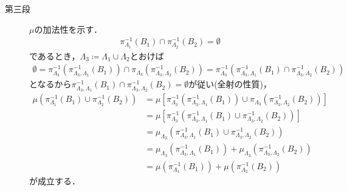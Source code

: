 \begin{prf}
\begin{description}
			\item[第三段]
				$\mu$の加法性を示す．
				\begin{align}
					\pi_{\Lambda_1}^{-1}(B_1) \cap \pi_{\Lambda_2}^{-1}(B_2) = \emptyset
				\end{align}
				であるとき，$\Lambda_3 \coloneqq \Lambda_1 \cup \Lambda_2$とおけば
				\begin{align}
					\emptyset 
					= \pi_{\Lambda_3}^{-1}\left( \pi_{\Lambda_3,\Lambda_1}^{-1}(B_1) \right)
					\cap \pi_{\Lambda_3}\left( \pi_{\Lambda_3,\Lambda_2}^{-1}(B_2) \right)
					= \pi_{\Lambda_3}^{-1}\left( \pi_{\Lambda_3,\Lambda_1}^{-1}(B_1) \cap \pi_{\Lambda_3,\Lambda_2}^{-1}(B_2) \right)
				\end{align}
				となるから$\pi_{\Lambda_3,\Lambda_1}^{-1}(B_1) \cap \pi_{\Lambda_3,\Lambda_2}^{-1}(B_2)
				= \emptyset$が従い(全射の性質)，
				\begin{align}
					\mu\left( \pi_{\Lambda_1}^{-1}(B_1) \cup \pi_{\Lambda_2}^{-1}(B_2) \right)
					&= \mu\left[\pi_{\Lambda_3}^{-1}\left( \pi_{\Lambda_3,\Lambda_1}^{-1}(B_1) \right)
					\cup \pi_{\Lambda_3}\left( \pi_{\Lambda_3,\Lambda_2}^{-1}(B_2) \right) \right] \\
					&= \mu\left[ \pi_{\Lambda_3}^{-1}\left( \pi_{\Lambda_3,\Lambda_1}^{-1}(B_1) \cup \pi_{\Lambda_3,\Lambda_2}^{-1}(B_2) \right) \right] \\
					&= \mu_{\Lambda_3} \left( \pi_{\Lambda_3,\Lambda_1}^{-1}(B_1) \cup \pi_{\Lambda_3,\Lambda_2}^{-1}(B_2) \right) \\
					&= \mu_{\Lambda_3} \left( \pi_{\Lambda_3,\Lambda_1}^{-1}(B_1) \right)
						+ \mu_{\Lambda_3} \left( \pi_{\Lambda_3,\Lambda_2}^{-1}(B_2) \right) \\
					&= \mu\left( \pi_{\Lambda_1}^{-1}(B_1) \right)
						+ \mu\left( \pi_{\Lambda_2}^{-1}(B_2) \right)
				\end{align}
				が成立する．
		\end{description}
	\end{prf}